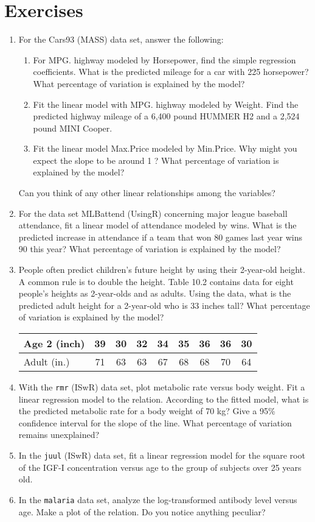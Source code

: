 \documentclass[11pt]{article}
\begin{document}
\section{Exercises}
\begin{enumerate}
\item  For the Cars93 (MASS) data set, answer the following:
  \begin{enumerate}
  \item For MPG. highway modeled by Horsepower, find the simple regression
    coefficients. What is the predicted mileage for a car with 225 horsepower?
    What percentage of variation is explained by the model?
  \item Fit the linear model with MPG. highway modeled by Weight. Find the predicted highway mileage of a 6,400 pound HUMMER H2 and a 2,524 pound MINI Cooper.
  \item Fit the linear model Max.Price modeled by Min.Price. Why might you expect the slope to be around 1 ? What percentage of variation is explained by the model?
  \end{enumerate}
  Can you think of any other linear relationships among the variables?
\item  For the data set MLBattend (UsingR) concerning major league baseball
  attendance, fit a linear model of attendance modeled by wins. What is the predicted increase in attendance if a team that won 80 games last year wins 90 this year? What percentage of variation is explained by the model?
\item  People often predict children’s future height by using their 2-year-old height. A common rule is to double the height. Table 10.2 contains data for eight people’s heights as 2-year-olds and as adults. Using the data, what is the predicted adult height for a 2-year-old who is 33 inches tall? What percentage of variation is explained by the model?

  \begin{tabular}{l c c c c c c c c}
    \hline
    Age 2 (inch) & 39 & 30 & 32 & 34 & 35 & 36 & 36 & 30 \\
    \hline
    Adult (in.) & 71 & 63 & 63 & 67 & 68 & 68 & 70 & 64 \\
    \hline
  \end{tabular}
\item With the \texttt{rmr} (ISwR) data set, plot metabolic rate versus body weight. Fit a linear regression model to the relation. According to the fitted model, what is the predicted metabolic rate for a body weight of 70 kg? Give a 95\% confidence interval for the slope of the line. What percentage of variation remains unexplained?
\item In the \texttt{juul} (ISwR) data set, fit a linear regression model for the square root of the IGF-I concentration versus age to the group of subjects over 25 years old.
\item In the \texttt{malaria} data set, analyze the log-transformed antibody level
  versus age. Make a plot of the relation. Do you notice anything peculiar?
\end{enumerate}
\end{document}
